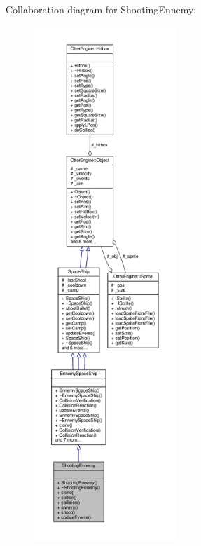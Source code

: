 Collaboration diagram for Shooting\+Ennemy\+:\nopagebreak
\begin{figure}[H]
\begin{center}
\leavevmode
\includegraphics[height=550pt]{db/da4/class_shooting_ennemy__coll__graph}
\end{center}
\end{figure}
